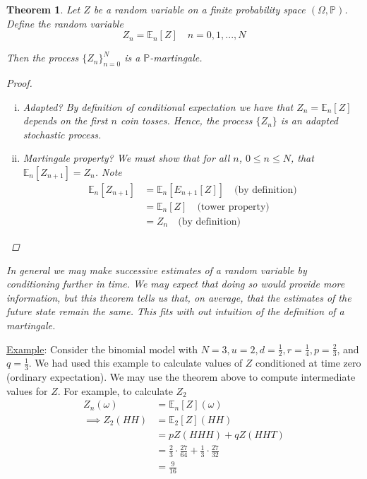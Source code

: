 \documentclass[12pt]{article}
\newtheorem{theorem}{Theorem}
\newlength\tindent
\renewcommand{\indent}{\hspace*{\tindent}}
\renewcommand{\P}{\mathbb P}
\newcommand{\E}{\mathbb E}
\begin{document}
\begin{theorem} Let $Z$ be a random variable on a finite probability space $(\Omega, \P)$. Define the random variable
\begin{equation*}
	Z_n = \E_n [Z] \quad n = 0, 1,..., N
\end{equation*}

Then the process $\{Z_n\}^N_{n = 0}$ is a $\P$-martingale.
\begin{proof} \hfill
\begin{enumerate}[(i)]
	\item Adapted? By definition of conditional expectation we have that $Z_n = \E_n[Z]$ depends on the first $n$ coin tosses. Hence, the process $\{Z_n\}$ is an adapted stochastic process.
	
	\item Martingale property? We must show that for all $n$, $0 \leq n \leq N$, that $\E_n[Z_{n + 1}] = Z_n$. Note
	\begin{align*}
		\E_n[Z_{n + 1}] &= \E_n [E_{n + 1}[Z]] \quad \text{(by definition)} \\
		&= \E_n[Z] \quad \text{(tower property)} \\
		&= Z_n \quad \text{(by definition)}
	\end{align*}
\end{enumerate}
\end{proof}

\indent In general we may make successive estimates of a random variable by conditioning further in time. We may expect that doing so would provide more information, but this theorem tells us that, on average, that the estimates of the future state remain the same. This fits with out intuition of the definition of a martingale.
\end{theorem}

\underline{Example}: Consider the binomial model with $N = 3, u = 2, d = \frac{1}{2}, r = \frac{1}{4}, p = \frac{2}{3}$, and $q = \frac{1}{3}$. We had used this example to calculate values of $Z$ conditioned at time zero (ordinary expectation). We may use the theorem above to compute intermediate values for $Z$. For example, to calculate $Z_2$
\begin{align*}
	Z_n(\omega) &= \E_n[Z](\omega) \\
\implies Z_2(HH) &= \E_2[Z](HH) \\
	&= pZ(HHH) + qZ(HHT) \\
	&= \frac{2}{3}\cdot\frac{27}{64} + \frac{1}{3}\cdot\frac{27}{32} \\
	&= \frac{9}{16}
\end{align*}
\end{document}
